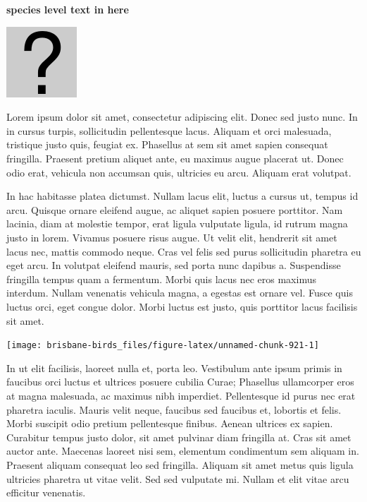 \documentclass[]{book}
\let\origfigure\figure
\let\endorigfigure\endfigure
\renewenvironment{figure}[1][2] {
  \expandafter\origfigure\expandafter[H]
} {
  \endorigfigure
}
\begin{document}
\textbf{species level text in here}

\begin{figure}
\centering
\includegraphics{assets/missing.png}
\caption{No image for species}
\end{figure}

Lorem ipsum dolor sit amet, consectetur adipiscing elit. Donec sed justo
nunc. In in cursus turpis, sollicitudin pellentesque lacus. Aliquam et
orci malesuada, tristique justo quis, feugiat ex. Phasellus at sem sit
amet sapien consequat fringilla. Praesent pretium aliquet ante, eu
maximus augue placerat ut. Donec odio erat, vehicula non accumsan quis,
ultricies eu arcu. Aliquam erat volutpat.

In hac habitasse platea dictumst. Nullam lacus elit, luctus a cursus ut,
tempus id arcu. Quisque ornare eleifend augue, ac aliquet sapien posuere
porttitor. Nam lacinia, diam at molestie tempor, erat ligula vulputate
ligula, id rutrum magna justo in lorem. Vivamus posuere risus augue. Ut
velit elit, hendrerit sit amet lacus nec, mattis commodo neque. Cras vel
felis sed purus sollicitudin pharetra eu eget arcu. In volutpat eleifend
mauris, sed porta nunc dapibus a. Suspendisse fringilla tempus quam a
fermentum. Morbi quis lacus nec eros maximus interdum. Nullam venenatis
vehicula magna, a egestas est ornare vel. Fusce quis luctus orci, eget
congue dolor. Morbi luctus est justo, quis porttitor lacus facilisis sit
amet.

\begin{figure}
\texttt{[image: brisbane-birds\_files/figure-latex/unnamed-chunk-921-1]} \caption{insert figure caption}\label{fig:unnamed-chunk-921}
\end{figure}

In ut elit facilisis, laoreet nulla et, porta leo. Vestibulum ante ipsum
primis in faucibus orci luctus et ultrices posuere cubilia Curae;
Phasellus ullamcorper eros at magna malesuada, ac maximus nibh
imperdiet. Pellentesque id purus nec erat pharetra iaculis. Mauris velit
neque, faucibus sed faucibus et, lobortis et felis. Morbi suscipit odio
pretium pellentesque finibus. Aenean ultrices ex sapien. Curabitur
tempus justo dolor, sit amet pulvinar diam fringilla at. Cras sit amet
auctor ante. Maecenas laoreet nisi sem, elementum condimentum sem
aliquam in. Praesent aliquam consequat leo sed fringilla. Aliquam sit
amet metus quis ligula ultricies pharetra ut vitae velit. Sed sed
vulputate mi. Nullam et elit vitae arcu efficitur venenatis.
\end{document}
